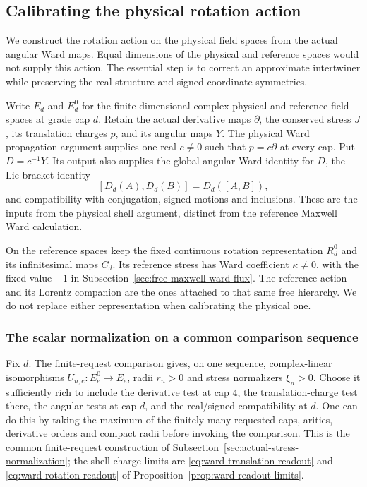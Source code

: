 \subsection{Calibrating the physical rotation action}
\label{sec:physical-angular-actions}

We construct the rotation action on the physical field spaces from the
actual angular Ward maps. Equal dimensions of the physical and reference
spaces would not supply this action. The essential step is to correct an
approximate intertwiner while preserving the real structure and signed
coordinate symmetries.

Write $E_d$ and $E_d^0$ for the finite-dimensional complex physical and
reference field spaces at grade cap $d$. Retain the actual derivative maps $\partial$, the conserved
stress $J$, its translation charges $p$, and its angular maps $Y$.
The physical Ward propagation argument supplies one real $c\ne0$ such
that $p=c\partial$ at every cap. Put $D=c^{-1}Y$. Its output also
supplies the global angular Ward identity for $D$, the Lie-bracket
identity
\[
                 [D_d(A),D_d(B)]=D_d([A,B]),
\]
and compatibility with conjugation, signed motions and inclusions.
These are the inputs from the physical shell argument, distinct from the
reference Maxwell Ward calculation.

On the reference spaces keep the fixed continuous rotation representation
$R_d^0$ and its infinitesimal maps $C_d$. Its reference stress has Ward
coefficient $\kappa\ne0$, with the fixed value $-1$ in
Subsection~\ref{sec:free-maxwell-ward-flux}. The reference action and its
Lorentz companion are the ones attached to that same free hierarchy.
We do not replace either representation when calibrating the physical one.

\subsubsection{The scalar normalization on a common comparison sequence}

Fix $d$. The finite-request comparison gives, on one sequence, complex-linear isomorphisms
$U_{n,e}:E_e^0\to E_e$, radii $r_n>0$ and stress normalizers $\xi_n>0$.
Choose it sufficiently rich to include the derivative test at cap $4$,
the translation-charge test there, the angular tests at cap $d$, and
the real/signed compatibility at $d$. One can do this by taking the
maximum of the finitely many requested caps, arities, derivative orders
and compact radii before invoking the comparison. This is the common
finite-request construction of
Subsection~\ref{sec:actual-stress-normalization}; the shell-charge limits
are \eqref{eq:ward-translation-readout} and
\eqref{eq:ward-rotation-readout} of
Proposition~\ref{prop:ward-readout-limits}.

